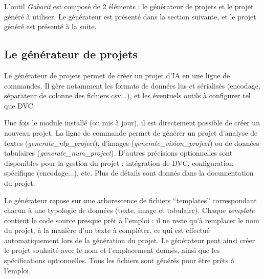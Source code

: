 
L'outil \textit{Gabarit} est composé de 2 éléments : le générateur de projets et le projet généré à utiliser. Le générateur est présenté dans la section suivante, et le projet généré est présenté à la suite.

\subsection{Le générateur de projets}

Le générateur de projets permet de créer un projet d'IA en une ligne de commandes. Il gère notamment les formats de données lus et sérialisés (encodage, séparateur de colonne des fichiers csv...), et les éventuels outils à configurer tel que DVC.

Une fois le module installé (ou mis à jour), il est directement possible de créer un nouveau projet. La ligne de commande permet de générer un projet d'analyse de textes (\textit{generate\_nlp\_project}), d'images (\textit{generate\_vision\_project}) ou de données tabulaires (\textit{generate\_num\_project}).
D'autres précisions optionnelles sont disponibles pour la gestion du projet : intégration de DVC, configuration spécifique (encodage...), etc. Plus de détails sont donnés dans la documentation du projet.

Le générateur repose sur une arborescence de fichiers ``templates'' correspondant chacun à une typologie de données (texte, image et tabulaire). Chaque \textit{template} contient le code source presque prêt à l'emploi : il ne reste qu'à remplacer le nom du projet, à la manière d'un texte à compléter, ce qui est effectué automatiquement lors de la génération du projet.
Le générateur peut ainsi créer le projet souhaité avec le nom et l'emplacement donnés, ainsi que les spécifications optionnelles. Tous les fichiers sont générés pour être prêts à l'emploi.

